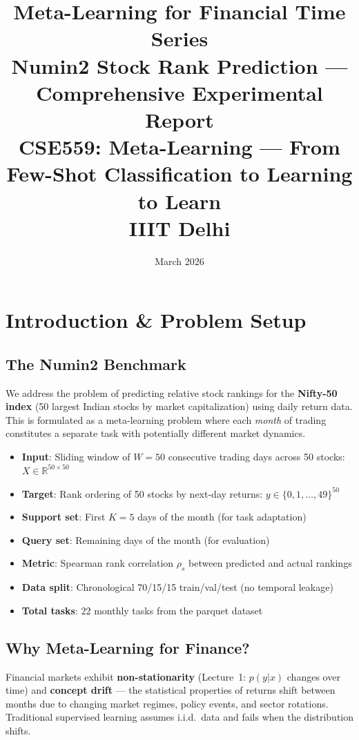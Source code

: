 \documentclass[11pt,a4paper]{article}
\title{\textbf{\LARGE Meta-Learning for Financial Time Series}\\[6pt]
\Large Numin2 Stock Rank Prediction --- Comprehensive Experimental Report\\[8pt]
\large CSE559: Meta-Learning --- From Few-Shot Classification to Learning to Learn\\IIIT Delhi}
\author{}\date{March 2026}
\begin{document}
\maketitle\thispagestyle{fancy}

\section{Introduction \& Problem Setup}

\subsection{The Numin2 Benchmark}
We address the problem of predicting relative stock rankings for the \textbf{Nifty-50 index} (50 largest Indian stocks by market capitalization) using daily return data. This is formulated as a meta-learning problem where each \emph{month} of trading constitutes a separate task with potentially different market dynamics.

\begin{tcolorbox}[colback=blue!3,colframe=blue!40!black,title=\textbf{Task Definition}]
\begin{itemize}[nosep,leftmargin=*]
  \item \textbf{Input}: Sliding window of $W\!=\!50$ consecutive trading days across 50 stocks: $X \in \mathbb{R}^{50 \times 50}$
  \item \textbf{Target}: Rank ordering of 50 stocks by next-day returns: $y \in \{0, 1, \ldots, 49\}^{50}$
  \item \textbf{Support set}: First $K\!=\!5$ days of the month (for task adaptation)
  \item \textbf{Query set}: Remaining days of the month (for evaluation)
  \item \textbf{Metric}: Spearman rank correlation $\rho_s$ between predicted and actual rankings
  \item \textbf{Data split}: Chronological 70/15/15 train/val/test (no temporal leakage)
  \item \textbf{Total tasks}: 22 monthly tasks from the parquet dataset
\end{itemize}
\end{tcolorbox}

\subsection{Why Meta-Learning for Finance?}
Financial markets exhibit \textbf{non-stationarity} (Lecture~1: $p(y|x)$ changes over time) and \textbf{concept drift} --- the statistical properties of returns shift between months due to changing market regimes, policy events, and sector rotations. Traditional supervised learning assumes i.i.d.\ data and fails when the distribution shifts.
\end{document}
